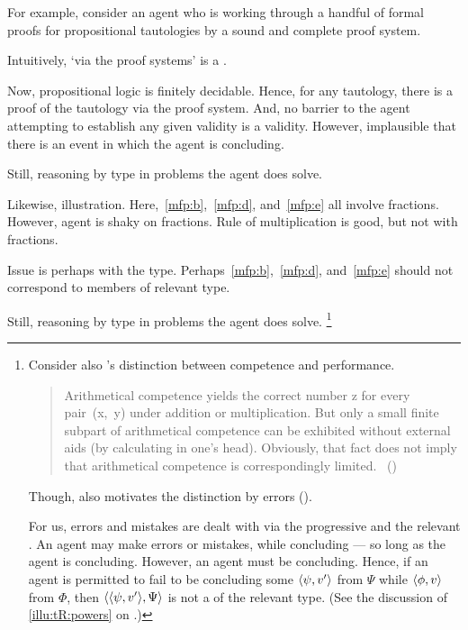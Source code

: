 \begin{note}
  For example, consider an agent who is working through a handful of formal proofs for propositional tautologies by a sound and complete proof system.

  Intuitively, `via the proof systems' is a \torN{}.

  Now, propositional logic is finitely decidable.
  Hence, for any tautology, there is a proof of the tautology via the proof system.
  And, no barrier to the agent attempting to establish any given validity is a validity.
  However, implausible that there is an event in which the agent is concluding.

  Still, reasoning by type in problems the agent does solve.

  Likewise, illustration.
  Here,~\ref{mfp:b},~\ref{mfp:d}, and~\ref{mfp:e} all involve fractions.
  However, agent is shaky on fractions.
  Rule of multiplication is good, but not with fractions.

  Issue is perhaps with the type.
  Perhaps~\ref{mfp:b},~\ref{mfp:d}, and~\ref{mfp:e} should not correspond to members of relevant type.

  Still, reasoning by type in problems the agent does solve.%
  \footnote{
    Consider also \citeauthor{Chomsky:2015aa}'s distinction between competence and performance.

    \begin{quote}
      Arithmetical competence yields the correct number z for every pair~(x,~y) under addition or multiplication.
      But only a small finite subpart of arithmetical competence can be exhibited without external aids (by calculating in one's head).
      Obviously, that fact does not imply that arithmetical competence is correspondingly limited.%
      \mbox{ }\hfill\mbox{(\citeyear[xii]{Chomsky:2015aa})}
    \end{quote}

    Though, \citeauthor{Chomsky:2015aa} also motivates the distinction by errors (\citeyear[2]{Chomsky:2015aa}).

    For us, errors and mistakes are dealt with via the progressive and the relevant \torN{}.
    An agent may make errors or mistakes, while concluding --- so long as the agent is concluding.
    However, an agent must be concluding.
    Hence, if an agent is permitted to fail to be concluding some \(\langle \psi, v' \rangle\) from \(\Psi\) while \tCV{} \(\langle \phi, v \rangle\) from \(\Phi\), then \(\langle \langle \psi, v' \rangle, \Psi \rangle\) is not a \tI{} of the relevant type.
    (See the discussion of \autoref{illu:tR:powers} on .)
}
\end{note}


